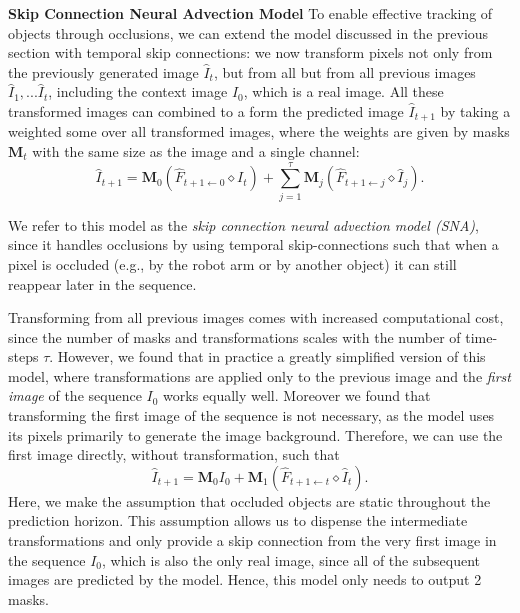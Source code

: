 \textbf{Skip Connection Neural Advection Model}
To enable effective tracking of objects through occlusions, we can extend the model discussed in the previous section with temporal skip connections: we now transform pixels not only from the previously generated image $\hat{I}_t$, but from all but from all previous images $\hat{I}_1,...\hat{I}_{t}$, including the context image $I_0$, which is a real image. All these transformed images can combined to a form the predicted image $\hat{I}_{t+1}$ by taking a weighted some over all transformed images, where the weights are given by masks $\mathbf{M}_t$ with the same size as the image and a single channel:
\begin{equation}
\hat{I}_{t+1} =  \mathbf{M}_{0} (\hat{F}_{t+1 \leftarrow 0} \diamond I_t) +  \sum_{j=1}^{\tau} \mathbf{M}_{j} (\hat{F}_{t+1 \leftarrow j} \diamond  \hat{I}_j).
\end{equation}

We refer to this model as the \emph{skip connection neural advection model (SNA)}, since it handles occlusions by using temporal skip-connections such that when a pixel is occluded (e.g., by the robot arm or by another object) it can still reappear later in the sequence.

Transforming from all previous images comes with increased computational cost, since the number of masks and transformations scales with the number of time-steps $\tau$. However, we found that in practice a greatly simplified version of this model, where transformations are applied only to the previous image and the \emph{first image} of the sequence $I_0$ works equally well. Moreover we found that transforming the first image of the sequence is not necessary, as the model uses its pixels primarily to generate the image background. Therefore, we can use the first image directly, without transformation, such that
\begin{equation}
\hat{I}_{t+1} = \mathbf{M}_{0} I_0 +  \mathbf{M}_{1} (\hat{F}_{t+1 \leftarrow t} \diamond \hat{I}_t).
\label{eqn:simplemodel}
\end{equation}
Here, we make the assumption that occluded objects are static throughout the prediction horizon. This assumption allows us to dispense the intermediate transformations and only provide a skip connection from the very first image in the sequence $I_0$, which is also the only real image, since all of the subsequent images are predicted by the model. Hence, this model only needs to output 2 masks. 


